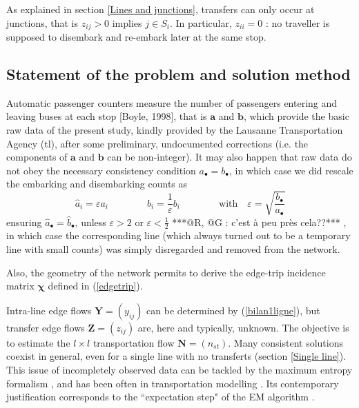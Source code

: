\documentclass{bmcart}
\begin{document}
\vspace*{0.1cm}



As explained in section \ref{Lines and junctions}, transfers can only occur at junctions, that is $z_{ij}>0$ implies $j\in S_i$. In particular,  $z_{ii}=0$ : no traveller is supposed to disembark and re-embark later at the same stop. 


 
\subsection{Statement of the problem and solution method}
Automatic passenger counters measure the number of passengers entering and leaving buses at each stop [Boyle, 1998], that is $\mathbf{a}$ and $\mathbf{b}$, which provide the basic raw data of the present study, kindly provided by the Lausanne Transportation Agency (tl), after some preliminary, undocumented corrections (i.e. the components of $\mathbf{a}$ and $\mathbf{b}$ can be non-integer). It may also happen that raw data do not obey the necessary consistency condition  $a_\bullet=b_\bullet$, in which case we did rescale the embarking and disembarking counts as 
\begin{displaymath}
\hat{a}_i=\varepsilon a_i \qquad\qquad \hat{b}_i=\frac{1}{\varepsilon} b_i \qquad\qquad\mbox{with}\quad \varepsilon=\sqrt{\frac{b_\bullet}{a_\bullet}}
\end{displaymath}
ensuring $\hat{a}_\bullet=\hat{b}_\bullet$, unless $\varepsilon> 2$ or $\varepsilon<\frac{1}{2}$ ***@R, @G : c'est à peu près cela??*** , in which case the corresponding line (which always turned out to be a temporary line with small  counts) was simply disregarded and removed from the network. 


Also, the geometry of the network permits to derive the edge-trip incidence matrix $\bm{\chi}$ defined in (\ref{edgetrip}). 


Intra-line edge flows $\mathbf{Y}=(y_{ij})$ can be determined by (\ref{bilan1ligne}), but transfer edge flows $\mathbf{Z}=(z_{ij})$ are, here and typically, unknown. The objective is to estimate the $l\times l$ transportation flow $\mathbf{N}=(n_{st})$. Many consistent solutions coexist in general, even for a single line with no transferts (section \ref{Single line}). This issue of incompletely observed data can be tackled by the maximum entropy formalism \cite{jaynes1957information}, and has been often  in transportation modelling \cite{wilson1967statistical}  \cite{erlander1990gravity}. Its contemporary justification corresponds to the ``expectation step" of the EM algorithm \cite{dempster1977maximum}  \cite{bavaud2009information}. 
\end{document}
